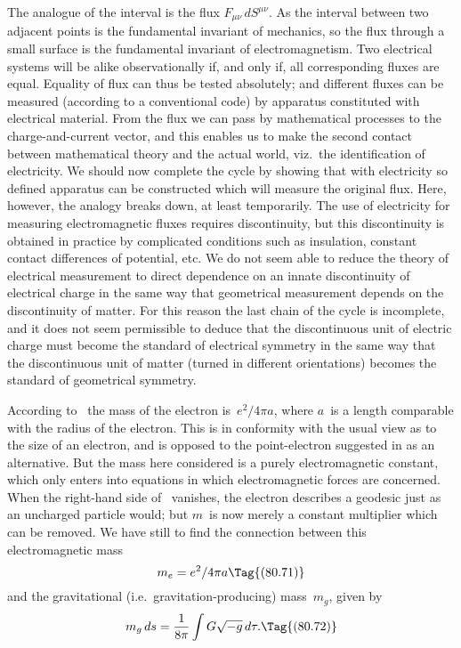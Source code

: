 \documentclass[12pt]{book}
\begin{document}
The analogue of the interval is the flux $F_{\mu\nu}\, dS^{\mu\nu}$. As the interval between
%
two adjacent points is the fundamental invariant of mechanics, so the flux
through a small surface is the fundamental invariant of electromagnetism.
Two electrical systems will be alike observationally if, and only if, all corresponding
fluxes are equal. Equality of flux can thus be tested absolutely; and
different fluxes can be measured (according to a conventional code) by apparatus
constituted with electrical material. From the flux we can pass by mathematical
processes to the charge\hyp{}and\hyp{}current vector, and this enables us to make
the second contact between mathematical theory and the actual world, viz.\ the
identification of electricity. We should now complete the cycle by showing
that with electricity so defined apparatus can be constructed which will measure
the original flux. Here, however, the analogy breaks down, at least temporarily.
The use of electricity for measuring electromagnetic fluxes requires discontinuity,
but this discontinuity is obtained in practice by complicated conditions
such as insulation, constant contact differences of potential, etc. We do not
seem able to reduce the theory of electrical measurement to direct dependence
on an innate discontinuity of electrical charge in the same way that geometrical
measurement depends on the discontinuity of matter. For this reason the last
chain of the cycle is incomplete, and it does not seem permissible to deduce
that the discontinuous unit of electric charge must become the standard of
electrical symmetry in the same way that the discontinuous unit of matter
(turned in different orientations) becomes the standard of geometrical symmetry.

According to~ the mass of the electron is~$e^{2}/4\pi a$, where $a$~is a length
comparable with the radius of the electron. This is in conformity with the
usual view as to the size of an electron, and is opposed to the point\hyp{}electron
suggested in  as an alternative. But the mass here considered is a purely
electromagnetic constant, which only enters into equations in which electromagnetic
forces are concerned. When the right-hand side of~ vanishes,
the electron describes a geodesic just as an uncharged particle would; but
$m$~is now merely a constant multiplier which can be removed. We have still to
find the connection between this electromagnetic mass
%
\[
m_{e} = e^{2}/4\pi a
\Tag{(80.71)}
\]
and the gravitational (i.e.\ gravitation\hyp{}producing) mass~$m_{g}$, given by
\[
m_{g}\, ds = \frac{1}{8\pi} \int G\sqrt{-g}\, d\tau.
\Tag{(80.72)}
\]
\end{document}
